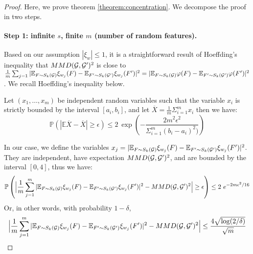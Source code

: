 \begin{proof}
Here, we prove theorem \ref{theorem:concentration}. We decompose the proof in two steps.

\paragraph{Step 1: infinite $s$, finite $m$ (number of random features).} Based on our assumption $|\xi_w|\leq 1$, it is a straightforward result of Hoeffding's inequality that  $MMD(\mathcal{G}, \mathcal{G}')^2$ is close to $\frac{1}{m} \sum_{j=1} | \mathbb{E}_{F \sim S_k(\mathcal{G})} \xi_{w_j}(F) - \mathbb{E}_{F' \sim S_k(\mathcal{G}')} \xi_{w_j}(F') |^2 = | \mathbb{E}_{F \sim S_k(\mathcal{G})} \varphi(F) - \mathbb{E}_{F' \sim S_k(\mathcal{G}')} \varphi(F') |^2$. We recall Hoeffding's inequality below.
\begin{lemma} 
Let $(x_1,\ldots, x_m)$ be independent random variables such that the variable $x_i$ is strictly bounded by the interval $[a_i , b_i]$, and let $\overline{X}=\frac{1}{m}\Sigma_{i=1}^{m}x_i$ then we have:
\begin{equation}
\label{eq:Hoeffding}
    \mathbb{P}(|\mathbb{E}\overline{X}-\overline{X}|\geq \epsilon)\leq 2~ \exp \left(-\frac{2m^2\epsilon^2}{\Sigma_{i=1}^m(b_i-a_i)^2)} \right)
\end{equation}
\end{lemma}
In our case, we define the variables $x_j=| \mathbb{E}_{F \sim S_k(\mathcal{G})} \xi_{w_j}(F) - \mathbb{E}_{F' \sim S_k(\mathcal{G}')} \xi_{w_j}(F') |^2$. They are independent, have expectation $MMD(\mathcal{G},\mathcal{G}')^2$, and are bounded by the interval $[0,4]$, thus we have:
\begin{equation*}
    \mathbb{P}\left(\Big|\frac{1}{m} \sum_{j=1}^m | \mathbb{E}_{F \sim S_k(\mathcal{G})} \xi_{w_j}(F) - \mathbb{E}_{F' \sim S_k(\mathcal{G}')} \xi_{w_j}(F') |^2 - MMD(\mathcal{G},\mathcal{G}')^2 \Big| \geq \epsilon\right) \leq 2~ e^{ -2m\epsilon^2/16}
\end{equation*}
Or, in other words, with probability $1-\delta$,
\begin{equation}\label{eq:step1}
\Big|\frac{1}{m} \sum_{j=1}^m | \mathbb{E}_{F \sim S_k(\mathcal{G})} \xi_{w_j}(F) - \mathbb{E}_{F' \sim S_k(\mathcal{G}')} \xi_{w_j}(F') |^2 - MMD(\mathcal{G},\mathcal{G}')^2 \Big| \leq \frac{4 \sqrt{\log (2/\delta)}}{\sqrt{m}}
\end{equation}


\end{proof}
